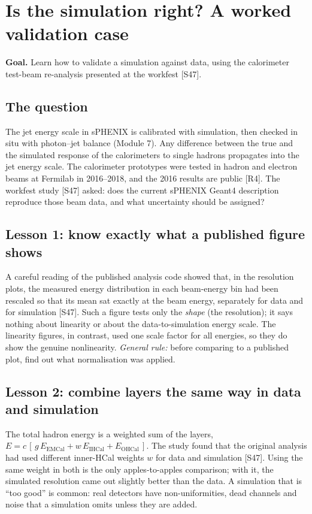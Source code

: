 \documentclass[11pt,letterpaper]{article}
\newcommand{\goal}[1]{\par\noindent\textbf{Goal.} #1\par}
\begin{document}
\section{Is the simulation right? A worked validation case}\label{sec:validate}
\goal{Learn how to validate a simulation against data, using the calorimeter test-beam re-analysis presented at the workfest [S47].}

\subsection{The question}
The jet energy scale in sPHENIX is calibrated with simulation, then checked in situ with photon--jet balance (Module 7).
Any difference between the true and the simulated response of the calorimeters to single hadrons propagates into the jet energy scale.
The calorimeter prototypes were tested in hadron and electron beams at Fermilab in 2016--2018, and the 2016 results are public [R4].
The workfest study [S47] asked: does the current sPHENIX Geant4 description reproduce those beam data, and what uncertainty should be assigned?

\subsection{Lesson 1: know exactly what a published figure shows}
A careful reading of the published analysis code showed that, in the resolution plots, the measured energy distribution in each beam-energy bin
had been rescaled so that its mean sat exactly at the beam energy, separately for data and for simulation [S47].
Such a figure tests only the \emph{shape} (the resolution); it says nothing about linearity or about the data-to-simulation energy scale.
The linearity figures, in contrast, used one scale factor for all energies, so they do show the genuine nonlinearity.
\emph{General rule:} before comparing to a published plot, find out what normalisation was applied.

\subsection{Lesson 2: combine layers the same way in data and simulation}
The total hadron energy is a weighted sum of the layers, $E = c\,[\,g\,E_{\mathrm{EMCal}} + w\,E_{\mathrm{IHCal}} + E_{\mathrm{OHCal}}\,]$.
The study found that the original analysis had used different inner-HCal weights $w$ for data and simulation [S47].
Using the same weight in both is the only apples-to-apples comparison; with it, the simulated resolution came out slightly better than the data.
A simulation that is ``too good'' is common: real detectors have non-uniformities, dead channels and noise that a simulation omits unless they are added.
\end{document}
